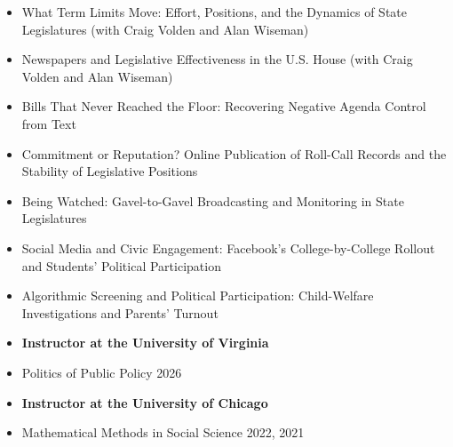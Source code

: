 \documentclass[11pt, Letter]{article}
\begin{document}
\vspace{4mm}

\begin{itemize}[leftmargin=47pt,itemindent=-21pt]
\item[] What Term Limits Move: Effort, Positions, and the Dynamics of State Legislatures (with Craig Volden and Alan Wiseman)
\item[] Newspapers and Legislative Effectiveness in the U.S. House (with Craig Volden and Alan Wiseman)
\item[] Bills That Never Reached the Floor: Recovering Negative Agenda Control from Text
\item[] Commitment or Reputation? Online Publication of Roll-Call Records and the Stability of Legislative Positions
\item[] Being Watched: Gavel-to-Gavel Broadcasting and Monitoring in State Legislatures
\item[] Social Media and Civic Engagement: Facebook's College-by-College Rollout and Students' Political Participation
\item[] Algorithmic Screening and Political Participation: Child-Welfare Investigations and Parents' Turnout
\end{itemize}

\vspace{4mm}


\begin{itemize}[leftmargin=47pt,itemindent=-21pt]
    \item[] \textbf{Instructor at the University of Virginia}
    \item[] Politics of Public Policy \hfill 2026
\end{itemize}

\vspace{3mm}

\begin{itemize}[leftmargin=47pt,itemindent=-21pt]
    \item[] \textbf{Instructor at the University of Chicago}
    \item[] Mathematical Methods in Social Science \hfill 2022, 2021\vspace{-0.5mm}
\end{itemize}

\vspace{3mm}
\end{document}
